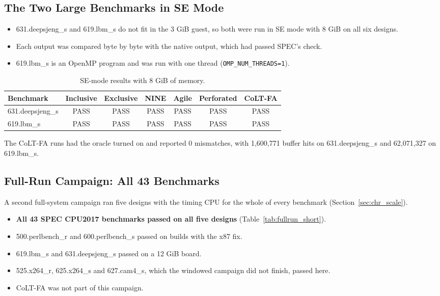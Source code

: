 \subsection{The Two Large Benchmarks in SE Mode}
\begin{itemize}
    \item 631.deepsjeng\_s and 619.lbm\_s do not fit in the 3 GiB guest, so both were run in SE mode with 8 GiB on all six designs.
    \item Each output was compared byte by byte with the native output, which had passed SPEC's check.
    \item 619.lbm\_s is an OpenMP program and was run with one thread (\texttt{OMP\_NUM\_THREADS=1}).
\end{itemize}

\begin{table}[H]
\centering
\small
\caption{SE-mode results with 8 GiB of memory.}
\label{tab:se_bigmem}
\begin{tabular}{l c c c c c c}
\toprule
\textbf{Benchmark} & \textbf{Inclusive} & \textbf{Exclusive} & \textbf{NINE} & \textbf{Agile} & \textbf{Perforated} & \textbf{CoLT-FA} \\
\midrule
631.deepsjeng\_s & PASS & PASS & PASS & PASS & PASS & PASS \\
619.lbm\_s & PASS & PASS & PASS & PASS & PASS & PASS \\
\bottomrule
\end{tabular}
\end{table}

\noindent The CoLT-FA runs had the oracle turned on and reported 0 mismatches, with 1,600,771 buffer hits on 631.deepsjeng\_s and 62,071,327 on 619.lbm\_s.

\subsection{Full-Run Campaign: All 43 Benchmarks}
A second full-system campaign ran five designs with the timing CPU for the whole of every benchmark (Section~\ref{sec:chr_scale}).
\begin{itemize}
    \item \textbf{All 43 SPEC CPU2017 benchmarks passed on all five designs} (Table~\ref{tab:fullrun_short}).
    \item 500.perlbench\_r and 600.perlbench\_s passed on builds with the x87 fix.
    \item 619.lbm\_s and 631.deepsjeng\_s passed on a 12 GiB board.
    \item 525.x264\_r, 625.x264\_s and 627.cam4\_s, which the windowed campaign did not finish, passed here.
    \item CoLT-FA was not part of this campaign.
\end{itemize}

